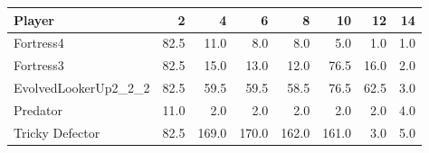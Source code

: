 \begin{tabular}{lrrrrrrr}
\toprule
               Player &     2 &      4 &      6 &      8 &     10 &    12 &   14 \\
\midrule
            Fortress4 &  82.5 &   11.0 &    8.0 &    8.0 &    5.0 &   1.0 &  1.0 \\
            Fortress3 &  82.5 &   15.0 &   13.0 &   12.0 &   76.5 &  16.0 &  2.0 \\
 EvolvedLookerUp2\_2\_2 &  82.5 &   59.5 &   59.5 &   58.5 &   76.5 &  62.5 &  3.0 \\
             Predator &  11.0 &    2.0 &    2.0 &    2.0 &    2.0 &   2.0 &  4.0 \\
      Tricky Defector &  82.5 &  169.0 &  170.0 &  162.0 &  161.0 &   3.0 &  5.0 \\
\bottomrule
\end{tabular}
